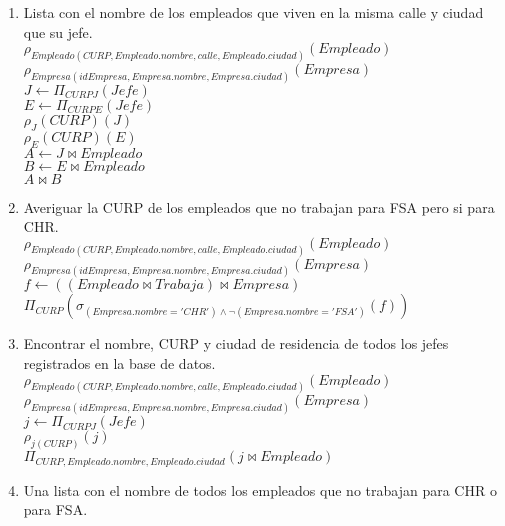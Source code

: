 \documentclass{article}
\begin{document}
\begin{enumerate}
\begin{enumerate}
				\item Lista con el nombre de los empleados que viven en la misma calle y ciudad que su jefe.\\
				
				$\rho_{Empleado(CURP, Empleado.nombre, calle, Empleado.ciudad)}(Empleado)$\\
				$\rho_{Empresa(idEmpresa, Empresa.nombre, Empresa.ciudad)}(Empresa)$\\
				$J \leftarrow \Pi_{CURPJ}(Jefe)$\\
				$E \leftarrow \Pi_{CURPE}(Jefe)$\\
				$\rho_{J}(CURP)(J)$\\
				$\rho_{E}(CURP)(E)$\\
				$A \leftarrow J \bowtie Empleado$\\			
				$B \leftarrow E \bowtie Empleado$\\
				$A \bowtie B$\\
				
				\item Averiguar la CURP de los empleados que no trabajan para FSA pero si para CHR.\\
				
				$\rho_{Empleado(CURP, Empleado.nombre, calle, Empleado.ciudad)}(Empleado)$\\
				$\rho_{Empresa(idEmpresa, Empresa.nombre, Empresa.ciudad)}(Empresa)$\\
				$f \leftarrow ((Empleado \bowtie Trabaja) \bowtie Empresa)$\\
				$\Pi_{CURP}(\sigma_{(Empresa.nombre = 'CHR') \land \lnot(Empresa.nombre = 'FSA')}(f))$\\
				
				\item Encontrar el nombre, CURP y ciudad de residencia de todos los jefes registrados en la base de
				datos.\\
				
				$\rho_{Empleado(CURP, Empleado.nombre, calle, Empleado.ciudad)}(Empleado)$\\
				$\rho_{Empresa(idEmpresa, Empresa.nombre, Empresa.ciudad)}(Empresa)$\\
				$j \leftarrow \Pi_{CURPJ}(Jefe)$\\
				$\rho_{j(CURP)}(j)$\\
				$\Pi_{CURP, Empleado.nombre, Empleado.ciudad}(j \bowtie Empleado)$\\
				
				\item Una lista con el nombre de todos los empleados que no trabajan para CHR o para FSA.\\
				

\end{enumerate}
\end{enumerate}
\end{document}

